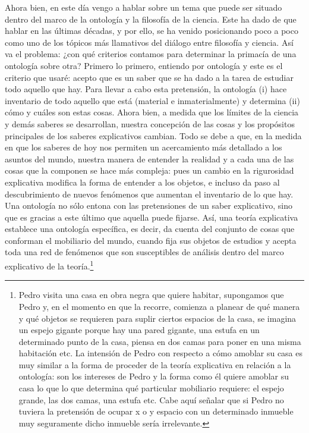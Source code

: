 \documentclass[]{book}
\begin{document}
\begin{refsection}
Ahora bien, en este día vengo a hablar sobre un tema que puede ser
situado dentro del marco de la ontología y la filosofía de la ciencia.
Este ha dado de que hablar en las últimas décadas, y por ello, se ha
venido posicionando poco a poco como uno de los tópicos más llamativos
del diálogo entre filosofía y ciencia. Así va el problema: ¿con qué
criterios contamos para determinar la primacía de una ontología sobre
otra? Primero lo primero, entiendo por ontología y este es el criterio
que usaré: acepto que es un saber que se ha dado a la tarea de estudiar
todo aquello que hay. Para llevar a cabo esta pretensión, la ontología
(i) hace inventario de todo aquello que está (material e
inmaterialmente) y determina (ii) cómo y cuáles son estas cosas. Ahora
bien, a medida que los límites de la ciencia y demás saberes se
desarrollan, nuestra concepción de las cosas y los propósitos
principales de los saberes explicativos cambian. Todo se debe a que, en
la medida en que los saberes de hoy nos permiten un acercamiento más
detallado a los asuntos del mundo, nuestra manera de entender la
realidad y a cada una de las cosas que la componen se hace más compleja:
pues un cambio en la rigurosidad explicativa modifica la forma de
entender a los objetos, e incluso da paso al descubrimiento de nuevos
fenómenos que aumentan el inventario de lo que hay. Una ontología no
sólo entona con las pretensiones de un saber explicativo, sino que es
gracias a este último que aquella puede fijarse. Así, una teoría
explicativa establece una ontología específica, es decir, da cuenta del
conjunto de cosas que conforman el mobiliario del mundo, cuando fija sus
objetos de estudios y acepta toda una red de fenómenos que son
susceptibles de análisis dentro del marco explicativo de la
teoría.\footnote{Pedro visita una casa en obra negra que quiere habitar,
  supongamos que Pedro y, en el momento en que la recorre, comienza a
  planear de qué manera y qué objetos se requieren para suplir ciertos
  espacios de la casa, se imagina un espejo gigante porque hay una pared
  gigante, una estufa en un determinado punto de la casa, piensa en dos
  camas para poner en una misma habitación etc. La intensión de Pedro
  con respecto a cómo amoblar su casa es muy similar a la forma de
  proceder de la teoría explicativa en relación a la ontología: son los
  intereses de Pedro y la forma como él quiere amoblar su casa lo que lo
  que determina qué particular mobiliario requiere: el espejo grande,
  las dos camas, una estufa etc. Cabe aquí señalar que si Pedro no
  tuviera la pretensión de ocupar x o y espacio con un determinado
  inmueble muy seguramente dicho inmueble sería irrelevante.}


\end{refsection}
\end{document}
